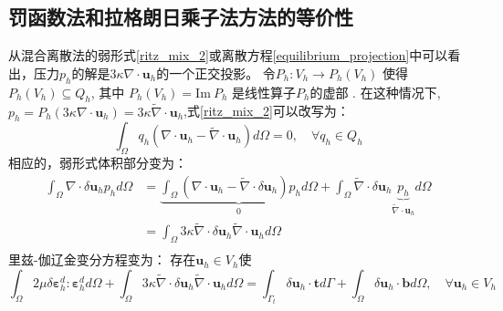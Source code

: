 \subsection{罚函数法和拉格朗日乘子法方法的等价性}
从混合离散法的弱形式\eqref{ritz_mix_2}或离散方程\eqref{equilibrium_projection}中可以看出，压力$p_h$的解是$3\kappa \nabla \cdot \boldsymbol u_h$的一个正交投影。
令$P_h: V_h \rightarrow P_h(V_h)$ 使得 $P_h(V_h) \subseteq Q_h$, 其中 $P_h(V_h) = \textrm{Im}\:P_h$ 是线性算子$P_h$的虚部 \cite{philippeg.2013}. 
在这种情况下, $p_h = P_h (3\kappa \nabla \cdot \boldsymbol u_h) = 3\kappa \tilde \nabla \cdot \boldsymbol u_h$,式\eqref{ritz_mix_2}可以改写为：
\begin{equation}
    \int_\Omega q_h(\nabla \cdot \boldsymbol u_h - \tilde \nabla \cdot \boldsymbol u_h) d\Omega = 0, \quad \forall q_h \in Q_h
\end{equation}
相应的，弱形式体积部分变为：
\begin{equation}\label{projection_mixed}
    \begin{split}
        \int_\Omega \nabla \cdot \delta \boldsymbol u_h p_h d\Omega &= \underbrace{\int_\Omega (\nabla \cdot \boldsymbol u_h - \tilde \nabla \cdot \delta \boldsymbol u_h) p_h d\Omega}_0 + \int_\Omega \tilde \nabla \cdot \delta \boldsymbol u_h \underbrace{p_h}_{\tilde \nabla \cdot \boldsymbol u_h} d\Omega \\
        &= \int_\Omega 3\kappa \tilde \nabla \cdot \delta \boldsymbol u_h \tilde \nabla \cdot \boldsymbol u_h d\Omega \\
    \end{split}
\end{equation}
里兹-伽辽金变分方程变为：
存在$\boldsymbol u_h \in V_h$使
\begin{equation}
    \int_\Omega 2\mu \delta \boldsymbol \varepsilon^d_h : \boldsymbol \varepsilon^d_h d\Omega +
    \int_\Omega 3\kappa \tilde \nabla \cdot \delta \boldsymbol u_h \tilde \nabla \cdot \boldsymbol u_h d\Omega =
    \int_{\Gamma_t} \delta \boldsymbol u_h \cdot \boldsymbol t d\Gamma + \int_\Omega \delta \boldsymbol u_h \cdot \boldsymbol b d\Omega, \quad \forall \boldsymbol u_h \in V_h
\end{equation}

